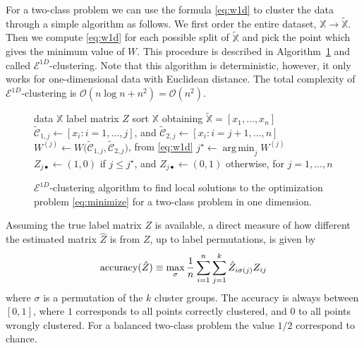 \documentclass[aps,preprint,nofootinbib,floatfix]{revtex4-1}
\DeclareMathOperator*{\argmin}{arg\,min}
\newcommand\C{{\mathcal{C}}}
\newcommand\tC{{\widetilde{\C}}}
\newcommand\OO{{\mathcal{O}}}
\begin{document}
For a two-class problem we can use the formula
\eqref{eq:w1d} to cluster the data
through a simple algorithm 
as follows. We first order
the entire dataset, $\mathbb{X} \to \widetilde{\mathbb{X}}$. Then 
we compute \eqref{eq:w1d} for each possible split of $\widetilde{\mathbb{X}}$
and pick the point which gives the minimum value of $W$.
This procedure is described in Algorithm~\ref{algo1d} and called
$\mathcal{E}^{1D}$-clustering.
Note that this algorithm is deterministic,
however,
it only works for one-dimensional data with Euclidean distance. The total
complexity of $\mathcal{E}^{1D}$-clustering is $\OO(n\log n + n^2) = \OO(n^2)$.

\begin{figure}
\begin{flushleft}
\begin{algorithm}[H]
\vspace{.5em}
\begin{algorithmic}[1]
\INPUT data $\mathbb{X}$
\OUTPUT label matrix $Z$
\STATE sort $\mathbb{X}$ obtaining 
$\widetilde{\mathbb{X}}= [ x_1,\dotsc,x_n ]$
        \STATE $\tC_{1,j} \leftarrow [x_i: i=1,\dotsc,j]$, and 
                $\tC_{2,j} \leftarrow [x_i : i=j+1,\dotsc,n]$
        \STATE  
            $W^{(j)} \leftarrow W \big( \tC_{1,j},\tC_{2,j}\big)$, 
            from \eqref{eq:w1d}
    \ENDFOR
    \STATE $j^\star \leftarrow \argmin_j W^{(j)}$ 
    \STATE $Z_{j\bullet} \leftarrow (1,0) $ if $j\le j^\star$, and
           $Z_{j\bullet} \leftarrow (0,1)$ otherwise, for $j=1,\dotsc,n$
\end{algorithmic}
\caption{
\label{algo1d}
$\mathcal{E}^{1D}$-clustering algorithm to
find local solutions to the optimization 
problem \eqref{eq:minimize} 
for a two-class problem in one dimension. \hspace{\fill}
}
\end{algorithm}
\end{flushleft}
\end{figure}

Assuming the true label matrix $Z$ is available, a direct
measure of how different the estimated matrix $\hat{Z}$ 
is from $Z$, up to label
permutations, is given by
\begin{equation}
\label{eq:accuracy}
\textnormal{accuracy}(\hat{Z}) \equiv \max_\sigma
\dfrac{1}{n}\sum_{i=1}^n\sum_{j=1}^k \hat{Z}_{i \sigma(j)} Z_{ij}
\end{equation}
where $\sigma$ is a permutation
of the $k$ cluster groups. 
The accuracy is always between $[0,1]$, where
$1$ corresponds to all points correctly clustered, and 
$0$ to all points wrongly clustered.
For a balanced two-class problem the value $1/2$ correspond
to chance.
\end{document}
